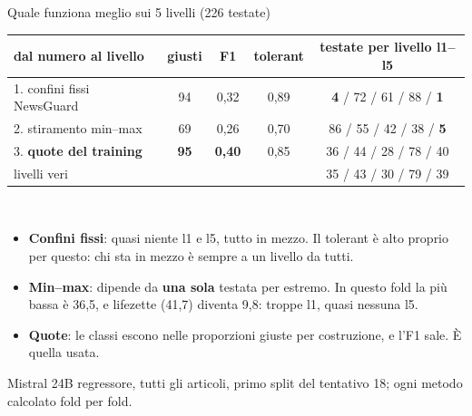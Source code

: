 \documentclass[aspectratio=169]{beamer}
\newcommand{\hl}[1]{\textbf{#1}}
\newcommand{\errore}[1]{\textcolor{rosso}{\textbf{#1}}}
\begin{document}
\begin{frame}{Quale funziona meglio sui 5 livelli (226 testate)}
  \centering\small
  \begin{tabular}{lcccc}
    \toprule
    \textbf{dal numero al livello} & \textbf{giusti} & \textbf{F1} & \textbf{tolerant} & \textbf{testate per livello l1--l5} \\
    \midrule
    1. confini fissi NewsGuard & 94 & 0,32 & 0,89 & \errore{4} / 72 / 61 / 88 / \errore{1} \\
    2. stiramento min--max & 69 & 0,26 & 0,70 & 86 / 55 / 42 / 38 / \errore{5} \\
    3. \hl{quote del training} & \textbf{95} & \textbf{0,40} & 0,85 & 36 / 44 / 28 / 78 / 40 \\
    \midrule
    livelli veri & & & & 35 / 43 / 30 / 79 / 39 \\
    \bottomrule
  \end{tabular}\\[1em]
  \raggedright
  \begin{itemize}
    \setlength\itemsep{0.4em}
    \item \hl{Confini fissi}: quasi niente l1 e l5, tutto in mezzo. Il tolerant \`e alto proprio per questo: chi sta in mezzo \`e
          sempre a un livello da tutti.
    \item \hl{Min--max}: dipende da \hl{una sola} testata per estremo. In questo fold la pi\`u bassa \`e 36,5, e lifezette
          (41,7) diventa 9,8: troppe l1, quasi nessuna l5.
    \item \hl{Quote}: le classi escono nelle proporzioni giuste per costruzione, e l'F1 sale. \`E quella usata.
  \end{itemize}
  {\scriptsize Mistral 24B regressore, tutti gli articoli, primo split del tentativo 18; ogni metodo calcolato fold per fold.}
\end{frame}
\end{document}
